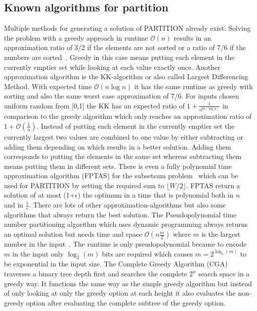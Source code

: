 \subsection{Known algorithms for partition}
Multiple methods for generating a solution of PARTITION already exist.
Solving the problem with a greedy approach in runtime $\mathcal{O}(n)$ results in an approximation ratio of 3/2 if the elements are not sorted or a ratio of 7/6 if the numbers are sorted~\cite{graham1966bounds}.
Greedy in this case means putting each element in the currently emptier set while looking at each value exactly once.
Another approximation algorithm is the KK-algorithm or also called Largest Differencing Method.
With expected time $\mathcal{O}(n\log{}n)$ it has the same runtime as greedy with sorting and also the same worst case approximation of 7/6.
For inputs chosen uniform random from [0,1] the KK has an expected ratio of \(1+\frac{1}{n^{\Theta(\log{}n)}}\) in comparison to the greedy algorithm which only reaches an approximation ratio of \(1+\mathcal{O}(\frac{1}{n})\).
Instead of putting each element in the currently emptier set the currently largest two values are combined to one value by either subtracting or adding them depending on which results in a better solution.
Adding them corresponds to putting the elements in the same set whereas subtracting them means putting them in different sets. 
There is even a fully polynomial time approximation algorithm (FPTAS) for the subsetsum problem~\cite{KELLERER2003349} which can be used for PARTITION by setting the required sum to $\lfloor W/2\rfloor$.
FPTAS return a solution of at most (1+$\epsilon$) the optimum in a time that is polynomial both in $n$ and in $\frac{1}{\epsilon}$.
There are lots of other approximation-algorithms but also some algorithms that always return the best solution.
The Pseudopolynomial time number partitioning algorithm which uses dynamic programming always returns an optimal solution but needs time and space $\mathcal{O}(n\frac{m}{2})$ where $m$ is the largest number in the input~\cite{korf2009multi}.
The runtime is only pseudopolynomial because to encode $m$ in the input only $\log_{2}{(m)}$ bits are required which causes \(m=2^{\log_{2}{(m)}}\) to be exponential in the input size.
The Complete Greedy Algorithm (CGA)~\cite{korf1998complete} traverses a binary tree depth first and searches the complete $2^n$ search space in a greedy way.
It functions the same way as the simple greedy algorithm but instead of only looking at only the greedy option at each height it also evaluates the non-greedy option after evaluating the complete subtree of the greedy option.
